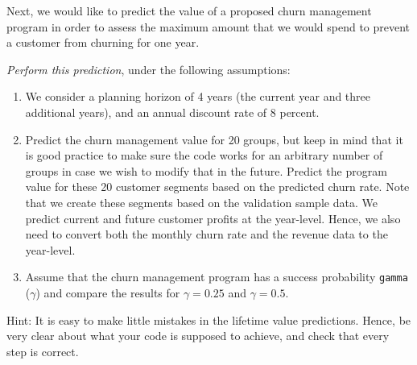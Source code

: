 \documentclass[
]{article}
\providecommand{\tightlist}{%
  \setlength{\itemsep}{0pt}\setlength{\parskip}{0pt}}
\begin{document}
Next, we would like to predict the value of a proposed churn management
program in order to assess the maximum amount that we would spend to
prevent a customer from churning for one year.

\emph{Perform this prediction}, under the following assumptions:

\begin{enumerate}
\def\labelenumi{\arabic{enumi}.}
\tightlist
\item
  We consider a planning horizon of 4 years (the current year and three
  additional years), and an annual discount rate of 8 percent.
\item
  Predict the churn management value for 20 groups, but keep in mind
  that it is good practice to make sure the code works for an arbitrary
  number of groups in case we wish to modify that in the future. Predict
  the program value for these 20 customer segments based on the
  predicted churn rate. Note that we create these segments based on the
  validation sample data. We predict current and future customer profits
  at the year-level. Hence, we also need to convert both the monthly
  churn rate and the revenue data to the year-level.
\item
  Assume that the churn management program has a success probability
  \texttt{gamma} (\(\gamma\)) and compare the results for
  \(\gamma=0.25\) and \(\gamma=0.5\).
\end{enumerate}

\medskip

Hint: It is easy to make little mistakes in the lifetime value
predictions. Hence, be very clear about what your code is supposed to
achieve, and check that every step is correct.
\end{document}
